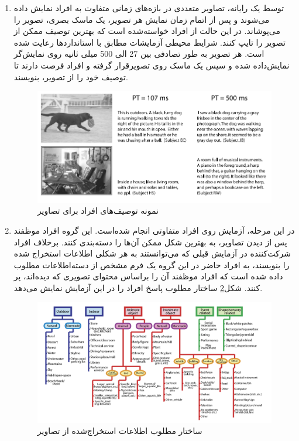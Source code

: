 \begin{enumerate}
\item توسط یک رایانه، تصاویر متعددی در بازه‌های زمانی متفاوت به افراد نمایش داده می‌شوند و پس از اتمام زمان نمایش هر تصویر، یک ماسک بصری، تصویر را می‌پوشاند. در این حالت از افراد خواسته‌شده  است که بهترین توصیف ممکن از تصویر را تایپ کنند. شرایط محیطی آزمایشات مطابق با استانداردها رعایت شده است. هر تصویر به طور تصادفی بین 27 الی 500 میلی ثانیه روی نمایش‌گر نمایش‌داده شده و سپس یک ماسک روی تصویرقرار گرفته و افراد فرصت دارند تا توصیف خود را از تصویر، بنویسند.


\begin{figure}[H]
\center
\includegraphics[scale=0.5]{./Imgs/fei2007we_res2.png}
\caption[نمونه توصیف‌های افراد برای تصاویر]{نمونه‌ توصیف‌های افراد برای تصاویر\cite{fei2007we}}
\label{fig:f2007we1}
\end{figure}



\item در این مرحله، آزمایش روی افراد متفاوتی انجام شده‌است. این گروه افراد موظفند پس از دیدن تصاویر، به بهترین شکل ممکن آن‌ها را دسته‌بندی کنند. برخلاف افراد شرکت‌کننده در آزمایش قبلی  که می‌توانستند به هر شکلی اطلاعات استخراج شده را بنویسند، به افراد حاضر در این گروه یک فرم مشخص از دسته‌اطلاعات مطلوب داده شده است که افراد موظفند آن را براساس محتوای تصویری که دیده‌اند، پر کنند. شکل\ref{fig:f2007we2}
ساختار مطلوب پاسخ افراد را در این آزمایش نمایش می‌دهد.

\begin{figure}[H]
\center
\includegraphics[scale=0.4]{./Imgs/fei2007we_exp1.png}
\caption{ساختار مطلوب اطلاعات استخراج‌شده از تصاویر\cite{fei2007we}}
\label{fig:f2007we2}
\end{figure}


\end{enumerate}
